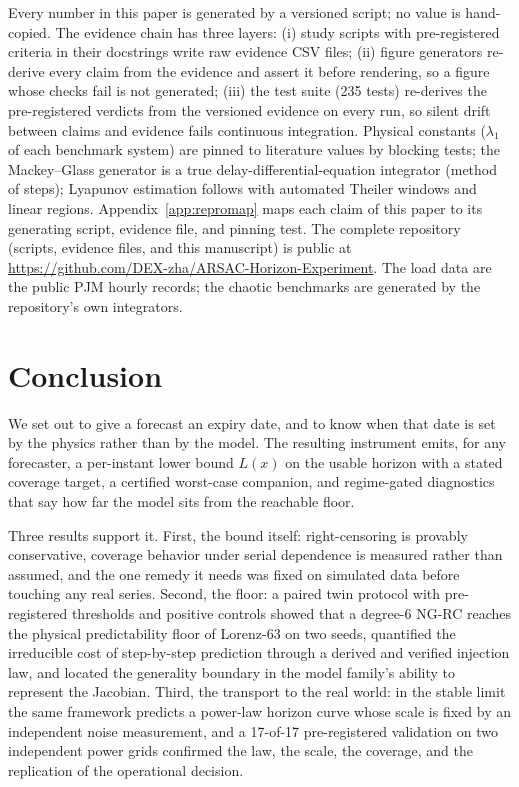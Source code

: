 \documentclass[aps,pre,twocolumn,superscriptaddress,nofootinbib,longbibliography]{revtex4-2}
\begin{document}
Every number in this paper is generated by a versioned script; no value
is hand-copied. The evidence chain has three layers: (i) study scripts
with pre-registered criteria in their docstrings write raw evidence CSV
files; (ii) figure generators re-derive every claim from the evidence and
assert it before rendering, so a figure whose checks fail is not
generated; (iii) the test suite (235 tests) re-derives the pre-registered
verdicts from the versioned evidence on every run, so silent drift
between claims and evidence fails continuous integration. Physical
constants ($\lambda_1$ of each benchmark system) are pinned to literature
values by blocking tests; the Mackey--Glass generator is a true
delay-differential-equation integrator (method of steps); Lyapunov
estimation follows \citet{rosenstein1993practical} with automated Theiler
windows and linear regions. Appendix~\ref{app:repromap} maps each claim
of this paper to its generating script, evidence file, and pinning test.
The complete repository (scripts, evidence files, and this manuscript) is
public at \url{https://github.com/DEX-zha/ARSAC-Horizon-Experiment}. The
load data are the public PJM hourly records; the chaotic benchmarks are
generated by the repository's own integrators.

\section{Conclusion}
\label{sec:conclusion}

We set out to give a forecast an expiry date, and to know when that date
is set by the physics rather than by the model. The resulting instrument
emits, for any forecaster, a per-instant lower bound $L(x)$ on the usable
horizon with a stated coverage target, a certified worst-case companion,
and regime-gated diagnostics that say how far the model sits from the
reachable floor.

Three results support it. First, the bound itself: right-censoring is
provably conservative, coverage behavior under serial dependence is
measured rather than assumed, and the one remedy it needs was fixed on
simulated data before touching any real series. Second, the floor: a
paired twin protocol with pre-registered thresholds and positive controls
showed that a degree-6 NG-RC reaches the physical predictability floor of
Lorenz-63 on two seeds, quantified the irreducible cost of step-by-step
prediction through a derived and verified injection law, and located the
generality boundary in the model family's ability to represent the
Jacobian. Third, the transport to the real world: in the stable limit the
same framework predicts a power-law horizon curve whose scale is fixed by
an independent noise measurement, and a 17-of-17 pre-registered
validation on two independent power grids confirmed the law, the scale,
the coverage, and the replication of the operational decision.
\end{document}
